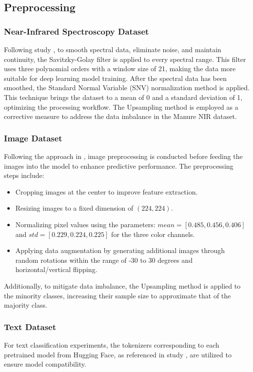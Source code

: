 \documentclass[a4paper,fleqn]{cas-sc}
\begin{document}
\subsection{Preprocessing}
\subsubsection{Near-Infrared Spectroscopy Dataset} Following study \cite{hieu2024nirsvit}, to smooth spectral data, eliminate noise, and maintain continuity, the Savitzky-Golay filter is applied to every spectral range. This filter uses three polynomial orders with a window size of 21, making the data more suitable for deep learning model training. After the spectral data has been smoothed, the Standard Normal Variable (SNV) normalization method is applied. This technique brings the dataset to a mean of 0 and a standard deviation of 1, optimizing the processing workflow. The Upsampling method is employed as a corrective measure to address the data imbalance in the Manure NIR dataset.

\subsubsection{Image Dataset} 
Following the approach in \cite{van2023plantkvit}, image preprocessing is conducted before feeding the images into the model to enhance predictive performance. The preprocessing steps include:  
\begin{itemize}
    \item Cropping images at the center to improve feature extraction.
    \item Resizing images to a fixed dimension of \((224, 224)\).
    \item Normalizing pixel values using the parameters: \(mean = [0.485, 0.456, 0.406]\) and \(std = [0.229, 0.224, 0.225]\) for the three color channels.
    \item Applying data augmentation by generating additional images through random rotations within the range of -30 to 30 degrees and horizontal/vertical flipping.
\end{itemize}  
Additionally, to mitigate data imbalance, the Upsampling method is applied to the minority classes, increasing their sample size to approximate that of the majority class.

\subsubsection{Text Dataset} 
For text classification experiments, the tokenizers corresponding to each pretrained model from Hugging Face, as referenced in study \cite{muennighoff2023mteb}, are utilized to ensure model compatibility.
\end{document}
